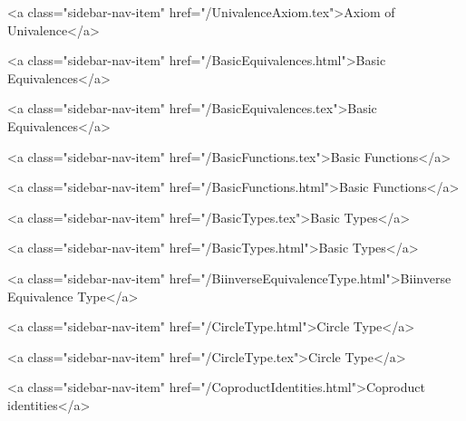           <a class="sidebar-nav-item" href="/UnivalenceAxiom.tex">Axiom of Univalence</a>
        
      
    
      
        
          <a class="sidebar-nav-item" href="/BasicEquivalences.html">Basic Equivalences</a>
        
      
    
      
        
          <a class="sidebar-nav-item" href="/BasicEquivalences.tex">Basic Equivalences</a>
        
      
    
      
        
          <a class="sidebar-nav-item" href="/BasicFunctions.tex">Basic Functions</a>
        
      
    
      
        
          <a class="sidebar-nav-item" href="/BasicFunctions.html">Basic Functions</a>
        
      
    
      
        
          <a class="sidebar-nav-item" href="/BasicTypes.tex">Basic Types</a>
        
      
    
      
        
          <a class="sidebar-nav-item" href="/BasicTypes.html">Basic Types</a>
        
      
    
      
        
          <a class="sidebar-nav-item" href="/BiinverseEquivalenceType.html">Biinverse Equivalence Type</a>
        
      
    
      
        
          <a class="sidebar-nav-item" href="/CircleType.html">Circle Type</a>
        
      
    
      
        
          <a class="sidebar-nav-item" href="/CircleType.tex">Circle Type</a>
        
      
    
      
        
          <a class="sidebar-nav-item" href="/CoproductIdentities.html">Coproduct identities</a>
        
      
    
